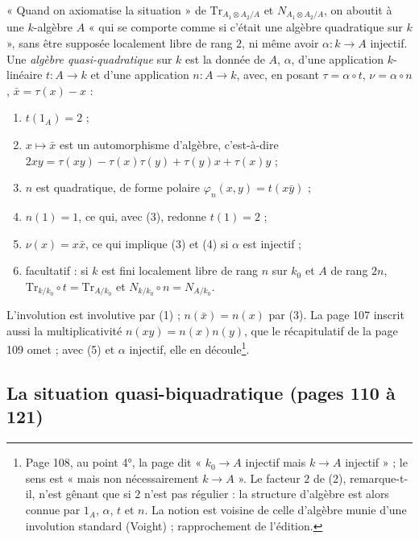 \documentclass[11pt,a4paper]{article}
\begin{document}
« Quand on axiomatise la situation » de $\mathrm{Tr}_{A_1 \otimes A_2/A}$ et
$N_{A_1 \otimes A_2/A}$, on aboutit à une $k$-algèbre $A$ « qui se comporte comme si
c'était une algèbre quadratique sur $k$ », sans être supposée localement libre de
rang $2$, ni même avoir $\alpha : k \to A$ injectif. Une \emph{algèbre
quasi-quadratique} sur $k$ est la donnée de $A$, $\alpha$, d'une application
$k$-linéaire $t : A \to k$ et d'une application $n : A \to k$, avec, en posant
$\tau = \alpha \circ t$, $\nu = \alpha \circ n$, $\bar{x} = \tau(x) - x$ :
\begin{enumerate}
\item[(1)] $t(1_A) = 2$ ;
\item[(2)] $x \mapsto \bar{x}$ est un automorphisme d'algèbre, c'est-à-dire
$2xy = \tau(xy) - \tau(x)\tau(y) + \tau(y)x + \tau(x)y$ ;
\item[(3)] $n$ est quadratique, de forme polaire $\varphi_n(x, y) = t(x\bar{y})$ ;
\item[(4)] $n(1) = 1$, ce qui, avec (3), redonne $t(1) = 2$ ;
\item[(5)] $\nu(x) = x\bar{x}$, ce qui implique (3) et (4) si $\alpha$ est injectif ;
\item[(6)] facultatif : si $k$ est fini localement libre de rang $n$ sur $k_0$ et $A$
de rang $2n$, $\mathrm{Tr}_{k/k_0} \circ t = \mathrm{Tr}_{A/k_0}$ et $N_{k/k_0} \circ n =
N_{A/k_0}$.
\end{enumerate}
L'involution est involutive par (1) ; $n(\bar{x}) = n(x)$ par (3). La page 107 inscrit
aussi la multiplicativité $n(xy) = n(x)n(y)$, que le récapitulatif de la page 109
omet ; avec (5) et $\alpha$ injectif, elle en découle\footnote{Page 108, au point
4°, la page dit « $k_0 \to A$ injectif mais $k \to A$ injectif » ; le sens est
« mais non nécessairement $k \to A$ ». Le facteur $2$ de (2), remarque-t-il, n'est
gênant que si $2$ n'est pas régulier : la structure d'algèbre est alors connue par
$1_A$, $\alpha$, $t$ et $n$. La notion est voisine de celle d'algèbre munie d'une
involution standard (Voight) ; rapprochement de l'édition.}.

\subsection*{La situation quasi-biquadratique (pages 110 à 121)}
\end{document}

